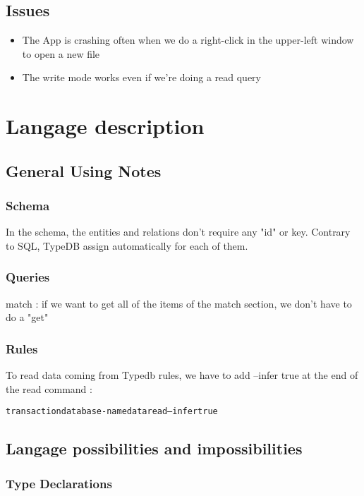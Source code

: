 \documentclass[runningheads]{llncs}
\begin{document}
\subsection{Issues}


\begin{itemize}
\item The App is crashing often when we do a right-click in the upper-left window to open a new file
\item The write mode works even if we're doing a read query
\end{itemize}

\section{Langage description}

\subsection{General Using Notes}


\subsubsection{Schema}
In the schema, the entities and relations don't require any "id" or key. Contrary to SQL, TypeDB assign automatically for each of them.

\subsubsection{Queries}
match : if we want to get all of the items of the match section, we don't have to do a "get"

\subsubsection{Rules}

To read data coming from Typedb rules, we have to add --infer true at the end of the read command : 
\begin{alltt}
transaction database-name data read --infer true
\end{alltt}


\subsection{Langage possibilities and impossibilities}

\subsubsection{Type Declarations}
\end{document}
